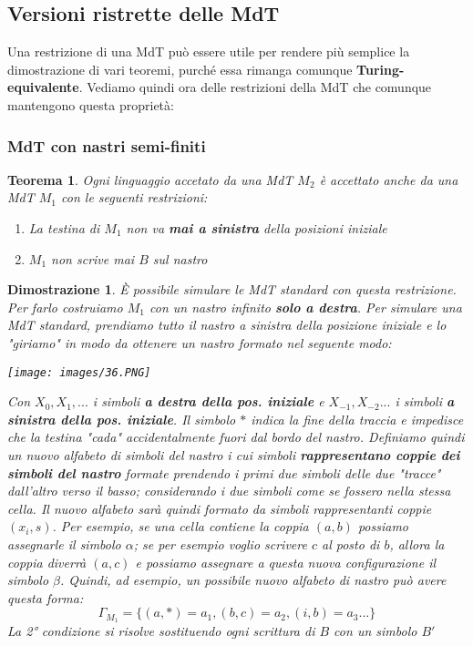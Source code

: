\documentclass[12pt]{article}
\newtheorem{Teorema}{Teorema}[subsection]
\newtheorem{Dimostrazione}{Dimostrazione}[subsection]
\begin{document}
\subsection{Versioni ristrette delle MdT}
Una restrizione di una MdT può essere utile per rendere più semplice la dimostrazione di vari teoremi, purché essa rimanga comunque \textbf{Turing-equivalente}. Vediamo quindi ora delle restrizioni della MdT che comunque mantengono questa proprietà:
\subsubsection{MdT con nastri semi-finiti}
\begin{Teorema}
    Ogni linguaggio accetato da una MdT $M_2$ è accettato anche da una MdT $M_1$ con le seguenti restrizioni:
    \begin{enumerate}
        \item La testina di $M_1$ non va \textbf{mai a sinistra} della posizioni iniziale
        \item $M_1$ non scrive mai $B$ sul nastro
    \end{enumerate}
\end{Teorema}
\begin{Dimostrazione}
    È possibile simulare le MdT standard con questa restrizione. Per farlo costruiamo $M_1$ con un nastro infinito \textbf{solo a destra}. Per simulare una MdT standard, prendiamo tutto il nastro a sinistra della posizione iniziale e lo "giriamo" in modo da ottenere un nastro formato nel seguente modo:
    \begin{center}
        \texttt{[image: images/36.PNG]}
    \end{center}
    Con $X_0, X_1, ...$ i simboli \textbf{a destra della pos. iniziale} e $X_{-1}, X_{-2}...$ i simboli \textbf{a sinistra della pos. iniziale}. Il simbolo $*$ indica la fine della traccia e impedisce che la testina "cada" accidentalmente fuori dal bordo del nastro. Definiamo quindi un nuovo alfabeto di simboli del nastro i cui simboli \textbf{rappresentano coppie dei simboli del nastro} formate prendendo i primi due simboli delle due "tracce" dall'altro verso il basso; considerando i due simboli come se fossero nella stessa cella. Il nuovo alfabeto sarà quindi formato da simboli rappresentanti coppie $(x_i, s)$. Per esempio, se una cella contiene la coppia $(a, b)$ possiamo assegnarle il simbolo $\alpha$; se per esempio voglio scrivere $c$ al posto di $b$, allora la coppia diverrà $(a, c)$ e possiamo assegnare a questa nuova configurazione il simbolo $\beta$. Quindi, ad esempio, un possibile nuovo alfabeto di nastro può avere questa forma:
    $$\Gamma_{M_1} = \{(a, *) = a_1, (b, c) = a_2, (i, b) = a_3 ...\}$$
    La 2° condizione si risolve sostituendo ogni scrittura di $B$ con un simbolo $B'$
\end{Dimostrazione}
\newpage
\end{document}
